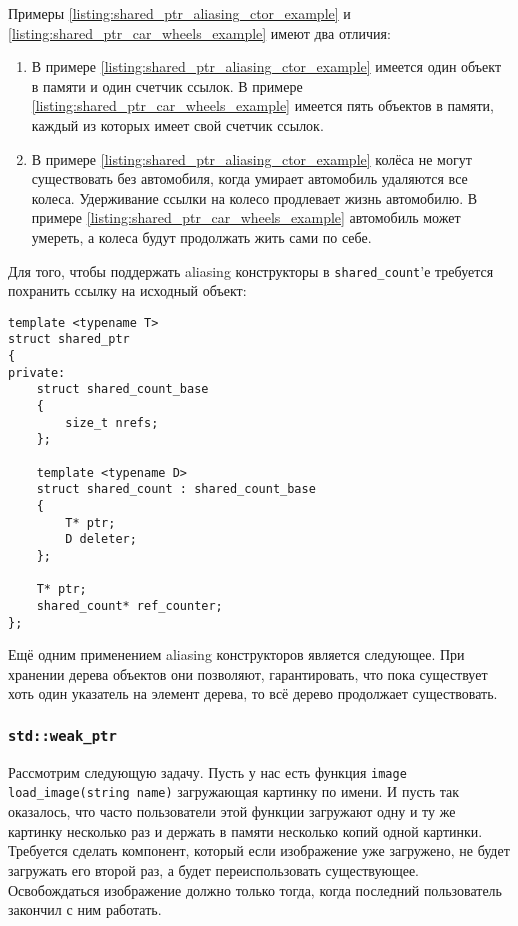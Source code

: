 Примеры \ref{listing:shared_ptr_aliasing_ctor_example} и \ref{listing:shared_ptr_car_wheels_example} имеют два отличия:
\begin{enumerate}
\item В примере \ref{listing:shared_ptr_aliasing_ctor_example} имеется один объект в памяти и один счетчик ссылок. В примере \ref{listing:shared_ptr_car_wheels_example} имеется пять объектов в памяти, каждый из которых имеет свой счетчик ссылок.
\item В примере \ref{listing:shared_ptr_aliasing_ctor_example} колёса не могут существовать без автомобиля, когда умирает автомобиль удаляются все колеса. Удерживание ссылки на колесо продлевает жизнь автомобилю. В примере \ref{listing:shared_ptr_car_wheels_example} автомобиль может умереть, а колеса будут продолжать жить сами по себе.
\end{enumerate}

Для того, чтобы поддержать aliasing конструкторы в \texttt{shared_count}'е требуется похранить ссылку на исходный объект:

\begin{verbatim}
template <typename T>
struct shared_ptr
{
private:
    struct shared_count_base
    {
        size_t nrefs;
    };
    
    template <typename D>
    struct shared_count : shared_count_base
    {
        T* ptr;
        D deleter;
    };
    
    T* ptr;
    shared_count* ref_counter;
};
\end{verbatim}

Ещё одним применением aliasing конструкторов является следующее. При хранении дерева объектов они позволяют, гарантировать, что пока существует хоть один указатель на элемент дерева, то всё дерево продолжает существовать.

\subsubsection{\texttt{std::weak_ptr}}

Рассмотрим следующую задачу. Пусть у нас есть функция \texttt{image load_image(string name)} загружающая картинку по имени. И пусть так оказалось, что часто пользователи этой функции загружают одну и ту же картинку несколько раз и держать в памяти несколько копий одной картинки. Требуется сделать компонент, который если изображение уже загружено, не будет загружать его второй раз, а будет переиспользовать существующее. Освобождаться изображение должно только тогда, когда последний пользователь закончил с ним работать.

